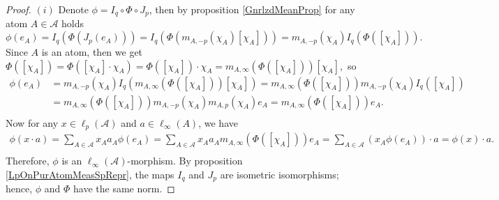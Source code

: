\documentclass[12pt]{article}
\begin{document}
\begin{proof} 
    $(i)$ Denote $\phi=I_q\circ \Phi\circ J_p$, then by 
    proposition \ref{GnrlzdMeanProp} for any atom $A\in\mathcal{A}$ holds
    $
        \phi(e_A)
        =I_q(\Phi(J_p(e_A)))
        =I_q(\Phi(m_{A,-p}(\chi_A)[\chi_A]))
        =m_{A,-p}(\chi_A)I_q(\Phi([\chi_A])).
    $
    Since $A$ is an atom, then we get
    $
        \Phi([\chi_A])
        =\Phi([\chi_A]\cdot\chi_A)
        =\Phi([\chi_A])\cdot\chi_A
        =m_{A,\infty}(\Phi([\chi_A]))[\chi_A],
    $
    so
    \[
    \begin{aligned}
        \phi(e_A)
        &=m_{A,-p}(\chi_A)I_q(m_{A,\infty}(\Phi([\chi_A]))[\chi_A]) 
        =m_{A,\infty}(\Phi([\chi_A]))m_{A,-p}(\chi_A)I_q([\chi_A]) \\
        &=m_{A,\infty}(\Phi([\chi_A]))m_{A,-p}(\chi_A)m_{A,p}(\chi_A)e_A 
        =m_{A,\infty}(\Phi([\chi_A]))e_A. \\
    \end{aligned}
    \]
    Now for any $x\in\ell_p(\mathcal{A})$ and $a\in\ell_\infty(A)$, we have
    \[
    \begin{aligned}
        \phi(x\cdot a)
        =\sum_{A\in\mathcal{A}} x_A a_A \phi(e_A) 
        =\sum_{A\in\mathcal{A}} x_A a_A m_{A,\infty}(\Phi([\chi_A]))e_A 
        =\sum_{A\in\mathcal{A}} (x_A \phi(e_A))\cdot a 
        =\phi(x)\cdot a. \\
    \end{aligned}
    \]
    Therefore, $\phi$ is an $\ell_\infty(\mathcal{A})$-morphism. By proposition 
    \ref{LpOnPurAtomMeasSpRepr}, the maps $I_q$ and $J_p$ are isometric 
    isomorphisms; hence, $\phi$ and $\Phi$ have the same norm.


\end{proof}
\end{document}
